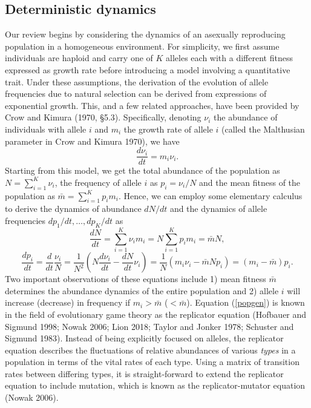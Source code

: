 \documentclass[]{article}
\begin{document}
\hypertarget{deterministic-dynamics}{%
\subsection{\texorpdfstring{Deterministic dynamics
\label{deterministic}}{Deterministic dynamics }}\label{deterministic-dynamics}}

Our review begins by considering the dynamics of an asexually
reproducing population in a homogeneous environment. For simplicity, we
first assume individuals are haploid and carry one of \(K\) alleles each
with a different fitness expressed as growth rate before introducing a
model involving a quantitative trait. Under these assumptions, the
derivation of the evolution of allele frequencies due to natural
selection can be derived from expressions of exponential growth. This,
and a few related approaches, have been provided by Crow and Kimura
(1970, \S 5.3). Specifically, denoting \(\nu_i\) the abundance of
individuals with allele \(i\) and \(m_i\) the growth rate of allele
\(i\) (called the Malthusian parameter in Crow and Kimura 1970), we have
\begin{equation}\label{first}
\frac{d\nu_i}{dt}=m_i\nu_i.
\end{equation} Starting from this model, we get the total abundance of
the population as \(N=\sum_{i=1}^K\nu_i\), the frequency of allele \(i\)
as \(p_i=\nu_i/N\) and the mean fitness of the population as
\(\bar m=\sum_{i=1}^Kp_im_i\). Hence, we can employ some elementary
calculus to derive the dynamics of abundance \(dN/dt\) and the dynamics
of allele frequencies \(dp_1/dt,\dots,dp_K/dt\) as \begin{equation}
\frac{dN}{dt}=\sum_{i=1}^K\nu_im_i=N\sum_{i=1}^Kp_im_i=\bar mN,
\end{equation} \begin{equation}\label{popgen}
\frac{dp_i}{dt}=\frac{d}{dt}\frac{\nu_i}{N}=\frac{1}{N^2}\left(N\frac{d\nu_i}{dt}-\frac{dN}{dt}\nu_i\right)
=\frac{1}{N}\left(m_i\nu_i-\bar m Np_i\right)=(m_i-\bar m)p_i.
\end{equation} Two important observations of these equations include 1)
mean fitness \(\bar m\) determines the abundance dynamics of the entire
population and 2) allele \(i\) will increase (decrease) in frequency if
\(m_i>\bar m\) (\(<\bar m\)). Equation (\ref{popgen}) is known in the
field of evolutionary game theory as the replicator equation (Hofbauer
and Sigmund 1998; Nowak 2006; Lion 2018; Taylor and Jonker 1978;
Schuster and Sigmund 1983). Instead of being explicitly focused on
alleles, the replicator equation describes the fluctuations of relative
abundances of various \emph{types} in a population in terms of the vital
rates of each type. Using a matrix of transition rates between differing
types, it is straight-forward to extend the replicator equation to
include mutation, which is known as the replicator-mutator equation
(Nowak 2006).
\end{document}
